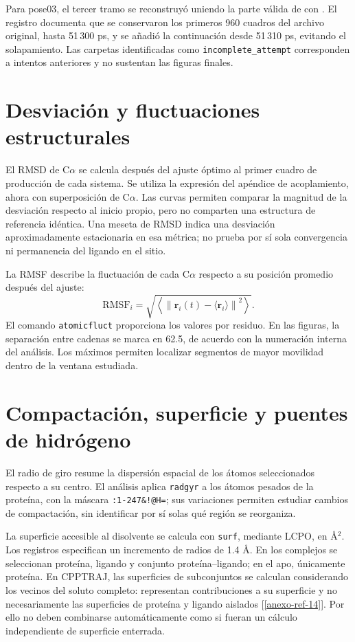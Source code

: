 \documentclass[12 pt, letter, oneside]{book}
\begin{document}
Para pose03, el tercer tramo se reconstruyó uniendo la parte válida de  con . El registro documenta que se conservaron los primeros 960 cuadros del archivo original, hasta 51\,300 ps, y se añadió la continuación desde 51\,310 ps, evitando el solapamiento. Las carpetas identificadas como \texttt{incomplete\_attempt} corresponden a intentos anteriores y no sustentan las figuras finales.

\section{Desviación y fluctuaciones estructurales}
El RMSD de C$\alpha$ se calcula después del ajuste óptimo al primer cuadro de producción de cada sistema. Se utiliza la expresión del apéndice de acoplamiento, ahora con superposición de C$\alpha$. Las curvas permiten comparar la magnitud de la desviación respecto al inicio propio, pero no comparten una estructura de referencia idéntica. Una meseta de RMSD indica una desviación aproximadamente estacionaria en esa métrica; no prueba por sí sola convergencia ni permanencia del ligando en el sitio.

La RMSF describe la fluctuación de cada C$\alpha$ respecto a su posición promedio después del ajuste:
\begin{equation}
 \mathrm{RMSF}_i=\sqrt{\left\langle\left\lVert\mathbf r_i(t)-\langle\mathbf r_i\rangle\right\rVert^2\right\rangle}.
\end{equation}
El comando \texttt{atomicfluct} proporciona los valores por residuo. En las figuras, la separación entre cadenas se marca en 62.5, de acuerdo con la numeración interna del análisis. Los máximos permiten localizar segmentos de mayor movilidad dentro de la ventana estudiada.

\section{Compactación, superficie y puentes de hidrógeno}
El radio de giro resume la dispersión espacial de los átomos seleccionados respecto a su centro. El análisis aplica \texttt{radgyr} a los átomos pesados de la proteína, con la máscara \texttt{:1-247\&!@H=}; sus variaciones permiten estudiar cambios de compactación, sin identificar por sí solas qué región se reorganiza.

La superficie accesible al disolvente se calcula con \texttt{surf}, mediante LCPO, en Å$^2$. Los registros especifican un incremento de radios de 1.4 Å. En los complejos se seleccionan proteína, ligando y conjunto proteína--ligando; en el apo, únicamente proteína. En CPPTRAJ, las superficies de subconjuntos se calculan considerando los vecinos del soluto completo: representan contribuciones a su superficie y no necesariamente las superficies de proteína y ligando aislados [\ref{anexo-ref-14}]. Por ello no deben combinarse automáticamente como si fueran un cálculo independiente de superficie enterrada.
\end{document}
